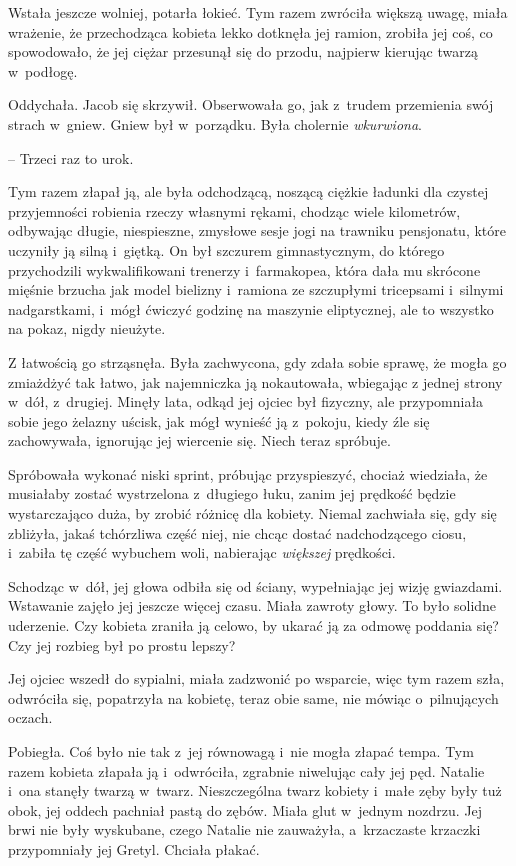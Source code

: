 \documentclass[oneside,polish,11pt,sfheadings]{mwbk}
\begin{document}
Wstała jeszcze wolniej, potarła łokieć. Tym razem zwróciła większą
uwagę, miała wrażenie, że przechodząca kobieta lekko dotknęła jej
ramion, zrobiła jej coś, co spowodowało, że jej ciężar przesunął się do
przodu, najpierw kierując twarzą w~podłogę.

Oddychała. Jacob się skrzywił. Obserwowała go, jak z~trudem przemienia
swój strach w~gniew. Gniew był w~porządku. Była cholernie
\textit{wkurwiona}.

-- Trzeci raz to urok.

Tym razem złapał ją, ale była odchodzącą, noszącą ciężkie ładunki dla
czystej przyjemności robienia rzeczy własnymi rękami, chodząc wiele
kilometrów, odbywając długie, niespieszne, zmysłowe sesje jogi na
trawniku pensjonatu, które uczyniły ją silną i~giętką. On był szczurem
gimnastycznym, do którego przychodzili wykwalifikowani trenerzy i~farmakopea, która dała mu skrócone mięśnie brzucha jak model bielizny i~ramiona ze szczupłymi tricepsami i~silnymi nadgarstkami, i~mógł ćwiczyć
godzinę na maszynie eliptycznej, ale to wszystko na pokaz, nigdy
nieużyte.

Z łatwością go strząsnęła. Była zachwycona, gdy zdała sobie sprawę, że
mogła go zmiażdżyć tak łatwo, jak najemniczka ją nokautowała, wbiegając
z jednej strony w~dół, z~drugiej. Minęły lata, odkąd jej ojciec był
fizyczny, ale przypomniała sobie jego żelazny uścisk, jak mógł wynieść
ją z~pokoju, kiedy źle się zachowywała, ignorując jej wiercenie się.
Niech teraz spróbuje.

Spróbowała wykonać niski sprint, próbując przyspieszyć, chociaż
wiedziała, że musiałaby zostać wystrzelona z~długiego łuku, zanim jej
prędkość będzie wystarczająco duża, by zrobić różnicę dla kobiety.
Niemal zachwiała się, gdy się zbliżyła, jakaś tchórzliwa część niej, nie
chcąc dostać nadchodzącego ciosu, i~zabiła tę część wybuchem woli,
nabierając \textit{większej} prędkości.

Schodząc w~dół, jej głowa odbiła się od ściany, wypełniając jej wizję
gwiazdami. Wstawanie zajęło jej jeszcze więcej czasu. Miała zawroty
głowy. To było solidne uderzenie. Czy kobieta zraniła ją celowo, by
ukarać ją za odmowę poddania się? Czy jej rozbieg był po prostu lepszy?

Jej ojciec wszedł do sypialni, miała zadzwonić po wsparcie, więc tym
razem szła, odwróciła się, popatrzyła na kobietę, teraz obie same, nie
mówiąc o~pilnujących oczach.

Pobiegła. Coś było nie tak z~jej równowagą i~nie mogła złapać tempa. Tym
razem kobieta złapała ją i~odwróciła, zgrabnie niwelując cały jej pęd.
Natalie i~ona stanęły twarzą w~twarz. Nieszczególna twarz kobiety i~małe
zęby były tuż obok, jej oddech pachniał pastą do zębów. Miała glut w~jednym nozdrzu. Jej brwi nie były wyskubane, czego Natalie nie
zauważyła, a~krzaczaste krzaczki przypomniały jej Gretyl. Chciała
płakać.
\end{document}
